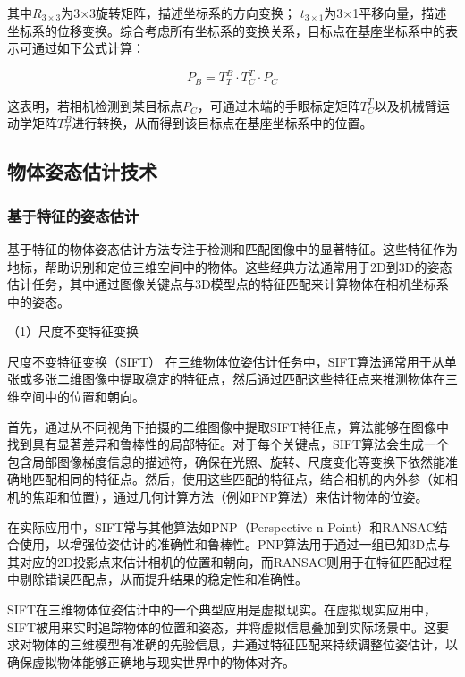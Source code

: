 其中$R_{3 \times 3}$为3$\times$3旋转矩阵，描述坐标系的方向变换； $t_{3 \times 1}$为3$\times$1平移向量，描述坐标系的位移变换。综合考虑所有坐标系的变换关系，目标点在基座坐标系中的表示可通过如下公式计算：

\begin{equation}
	\label{equ:coordinate_base_2}
	P_{B} = T^{B}_{T} \cdot T^{T}_{C} \cdot P_{C}
\end{equation}

这表明，若相机检测到某目标点$P_{C}$，可通过末端的手眼标定矩阵$T^{T}_{C}$以及机械臂运动学矩阵$T^{B}_{T}$进行转换，从而得到该目标点在基座坐标系中的位置。


\subsection{物体姿态估计技术}
\subsubsection{基于特征的姿态估计}
基于特征的物体姿态估计方法专注于检测和匹配图像中的显著特征。这些特征作为地标，帮助识别和定位三维空间中的物体。这些经典方法通常用于2D到3D的姿态估计任务，其中通过图像关键点与3D模型点的特征匹配来计算物体在相机坐标系中的姿态。

 \noindent
 （1）尺度不变特征变换
 
尺度不变特征变换\cite{lowe2004distinctive}（SIFT） 在三维物体位姿估计任务中，SIFT算法通常用于从单张或多张二维图像中提取稳定的特征点，然后通过匹配这些特征点来推测物体在三维空间中的位置和朝向。

首先，通过从不同视角下拍摄的二维图像中提取SIFT特征点，算法能够在图像中找到具有显著差异和鲁棒性的局部特征。对于每个关键点，SIFT算法会生成一个包含局部图像梯度信息的描述符，确保在光照、旋转、尺度变化等变换下依然能准确地匹配相同的特征点。然后，使用这些匹配的特征点，结合相机的内外参（如相机的焦距和位置），通过几何计算方法（例如PNP算法）来估计物体的位姿。

在实际应用中，SIFT常与其他算法如PNP\cite{lepetit2009ep}（Perspective-n-Point）和RANSAC结合使用，以增强位姿估计的准确性和鲁棒性。PNP算法用于通过一组已知3D点与其对应的2D投影点来估计相机的位置和朝向，而RANSAC\cite{fischler1981random}则用于在特征匹配过程中剔除错误匹配点，从而提升结果的稳定性和准确性。

SIFT在三维物体位姿估计中的一个典型应用是虚拟现实\cite{tekin2017learning}。在虚拟现实应用中，SIFT被用来实时追踪物体的位置和姿态，并将虚拟信息叠加到实际场景中。这要求对物体的三维模型有准确的先验信息，并通过特征匹配来持续调整位姿估计，以确保虚拟物体能够正确地与现实世界中的物体对齐。

